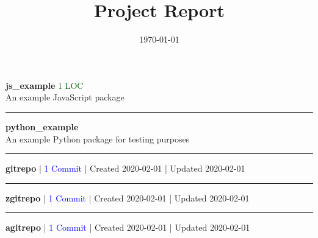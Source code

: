 \documentclass[]{article}
\begin{document}
\title{Project Report}
\author{}
\date{\today}
\maketitle
\textbf{js\_example}
\textcolor{darkgreen}{1 LOC}
\\
An example JavaScript package
\\
\noindent\rule{\textwidth}{0.4pt}


\vspace{0.5cm}
\textbf{python\_example}
\\
An example Python package for testing purposes
\\
\noindent\rule{\textwidth}{0.4pt}


\vspace{0.5cm}
\textbf{gitrepo}
|
\textcolor{blue}{1 Commit}
|
Created 2020-02-01
|
Updated 2020-02-01
\\
\noindent\rule{\textwidth}{0.4pt}


\vspace{0.5cm}
\textbf{zgitrepo}
|
\textcolor{blue}{1 Commit}
|
Created 2020-02-01
|
Updated 2020-02-01
\\
\noindent\rule{\textwidth}{0.4pt}


\vspace{0.5cm}
\textbf{agitrepo}
|
\textcolor{blue}{1 Commit}
|
Created 2020-02-01
|
Updated 2020-02-01
\\
\end{document}
